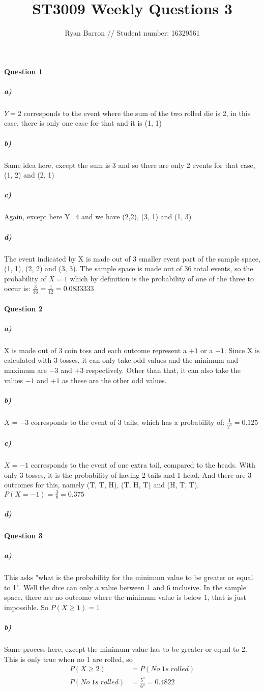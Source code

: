 \documentclass{article}
\title{ST3009 Weekly Questions 3}
\author{Ryan Barron // Student number: 16329561}
\date{}
\begin{document}
\maketitle

\paragraph{Question 1}
\subparagraph{a)}
$Y=2$ corresponds to the event where the sum of the two rolled die is 2, in this case, there is only one case for that and it is (1, 1)
\subparagraph{b)}
Same idea here, except the sum is 3 and so there are only 2 events for that case, (1, 2) and (2, 1)
\subparagraph{c)}
Again, except here Y=4 and we have (2,2), (3, 1) and (1, 3)
\subparagraph{d)}
The event indicated by X is made out of 3 smaller event part of the sample space, (1, 1), (2, 2) and (3, 3). The sample space is made out of 36 total events, so the probability of $X=1$ which by definition is the probability of one of the three to occur is: $\frac{3}{36} = \frac{1}{12} = 0.0833333$

\paragraph{Question 2}
\subparagraph{a)}
X is made out of 3 coin toss and each outcome represent a $+1$ or a $-1$. Since X is calculated with 3 tosses, it can only take odd values and the minimum and maximum are $-3$ and $+3$ respectively. Other than that, it can also take the values $-1$ and $+1$ as these are the other odd values.
\subparagraph{b)}
$X=-3$ corresponds to the event of 3 tails, which has a probability of: $\frac{1}{2^3} = 0.125$
\subparagraph{c)}
$X=-1$ corresponds to the event of one extra tail, compared to the heads. With only 3 tosses, it is the probability of having 2 tails and 1 head. And there are 3 outcomes for this, namely (T, T, H), (T, H, T) and (H, T, T).
$P(X=-1) = \frac{3}{8} = 0.375$
\subparagraph{d)}


\paragraph{Question 3}
\subparagraph{a)}
This asks "what is the probability for the minimum value to be greater or equal to 1". Well the dice can only a value between 1 and 6 inclusive. In the sample space, there are no outcome where the minimum value is below 1, that is just impossible. So $P(X\geq1) = 1$
\subparagraph{b)}
Same process here, except the minimum value has to be greater or equal to 2. This is only true when no 1 are rolled, so 
\begin{equation*}
\begin{split}
P(X\geq2) & = P(No\;1s\;rolled) \\
P(No\;1s\;rolled) & = \frac{5^4}{6^4} = 0.4822
\end{split}
\end{equation*}
\end{document}
